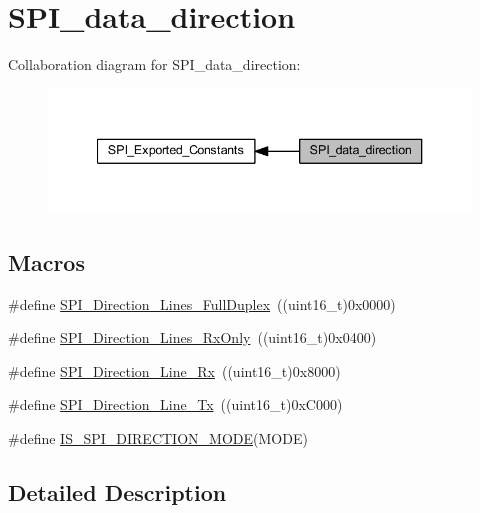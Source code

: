 \hypertarget{group___s_p_i__data__direction}{}\section{S\+P\+I\+\_\+data\+\_\+direction}
\label{group___s_p_i__data__direction}
Collaboration diagram for S\+P\+I\+\_\+data\+\_\+direction\+:
\nopagebreak
\begin{figure}[H]
\begin{center}
\leavevmode
\includegraphics[width=340pt]{group___s_p_i__data__direction}
\end{center}
\end{figure}
\subsection*{Macros}
\begin{DoxyCompactItemize}
\item 
\#define \hyperlink{group___s_p_i__data__direction_gab6bdb82e315a90210c4425c46bbdf5f1}{S\+P\+I\+\_\+\+Direction\+\_\+Lines\+\_\+\+Full\+Duplex}~((uint16\+\_\+t)0x0000)
\item 
\#define \hyperlink{group___s_p_i__data__direction_gab8ab942f7240394f50e4c86c5288516a}{S\+P\+I\+\_\+\+Direction\+\_\+Lines\+\_\+\+Rx\+Only}~((uint16\+\_\+t)0x0400)
\item 
\#define \hyperlink{group___s_p_i__data__direction_ga42ea8306cfc1f23ffc51efae6f66320e}{S\+P\+I\+\_\+\+Direction\+\_\+Line\+\_\+\+Rx}~((uint16\+\_\+t)0x8000)
\item 
\#define \hyperlink{group___s_p_i__data__direction_ga70cc710a771065b2ed11c2ac9697defe}{S\+P\+I\+\_\+\+Direction\+\_\+Line\+\_\+\+Tx}~((uint16\+\_\+t)0x\+C000)
\item 
\#define \hyperlink{group___s_p_i__data__direction_ga536857c68ce1d9806c04046707448b3e}{I\+S\+\_\+\+S\+P\+I\+\_\+\+D\+I\+R\+E\+C\+T\+I\+O\+N\+\_\+\+M\+O\+DE}(M\+O\+DE)
\end{DoxyCompactItemize}


\subsection{Detailed Description}


